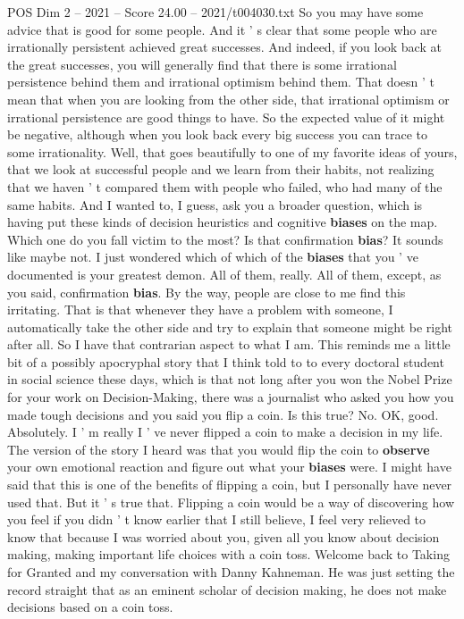 \begin{textsample}{POS Dim 2 – 2021 – Score 24.00 – 2021/t004030.txt}
So you may have some advice that is good for some people.
And it ' s clear that some people who are irrationally persistent achieved great successes.
And indeed, if you look back at the great successes, you will generally find that there is some irrational persistence behind them and irrational optimism behind them.
That doesn ' t mean that when you are looking from the other side, that irrational optimism or irrational persistence are good things to have.
So the expected value of it might be negative, although when you look back every big success you can trace to some irrationality.
Well, that goes beautifully to one of my favorite ideas of yours, that we look at successful people and we learn from their habits, not realizing that we haven ' t compared them with people who failed, who had many of the same habits.
And I wanted to, I guess, ask you a broader question, which is having put these kinds of decision heuristics and cognitive \textbf{biases} on the map.
Which one do you fall victim to the most?
Is that confirmation \textbf{bias}?
It sounds like maybe not.
I just wondered which of which of the \textbf{biases} that you ' ve documented is your greatest demon.
All of them, really.
All of them, except, as you said, confirmation \textbf{bias}.
By the way, people are close to me find this irritating.
That is that whenever they have a problem with someone, I automatically take the other side and try to explain that someone might be right after all.
So I have that contrarian aspect to what I am.
This reminds me a little bit of a possibly apocryphal story that I think told to to every doctoral student in social science these days, which is that not long after you won the Nobel Prize for your work on Decision-Making, there was a journalist who asked you how you made tough decisions and you said you flip a coin.
Is this true?
No.
OK, good.
Absolutely.
I ' m really I ' ve never flipped a coin to make a decision in my life.
The version of the story I heard was that you would flip the coin to \textbf{observe} your own emotional reaction and figure out what your \textbf{biases} were.
I might have said that this is one of the benefits of flipping a coin, but I personally have never used that.
But it ' s true that.
Flipping a coin would be a way of discovering how you feel if you didn ' t know earlier that I still believe, I feel very relieved to know that because I was worried about you, given all you know about decision making, making important life choices with a coin toss.
Welcome back to Taking for Granted and my conversation with Danny Kahneman.
He was just setting the record straight that as an eminent scholar of decision making, he does not make decisions based on a coin toss.

\end{textsample}
